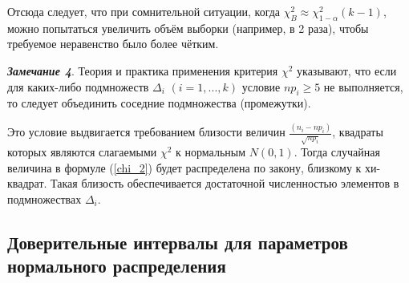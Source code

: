 Отсюда следует, что при сомнительной ситуации, когда $\chi^{2}_{B} \approx \chi^{2}_{1-\alpha}(k-1)$, можно попытаться увеличить объём выборки (например, в 2 раза), чтобы требуемое неравенство было более чётким.

\textbf{\textit{Замечание 4}}. Теория и практика применения критерия  $\chi^{2}$ указывают, что если для каких-либо подмножеств $\Delta_{i}$ $(i = 1, ... ,k)$ условие $np_{i} \geq 5$ не выполняется, то следует объединить соседние подмножества (промежутки).

Это условие выдвигается требованием близости величин $\frac{(n_{i} -np_{i})}{\sqrt{np_{i}}}$, квадраты которых являются слагаемыми $\chi^{2}$  к нормальным $N(0,1)$. Тогда случайная величина в формуле (\ref{chi_2}) будет распределена по закону, близкому к хи-квадрат. Такая близость обеспечивается достаточной численностью элементов в подмножествах $\Delta_{i}$.
\subsection{Доверительные интервалы для параметров нормального распределения}
